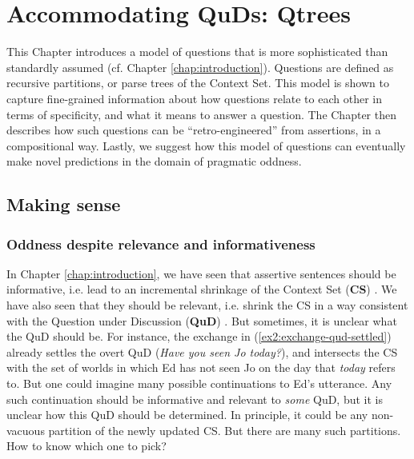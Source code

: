 \chapter{Accommodating QuDs: Qtrees}\label{chap:accommodating-quds}

This Chapter introduces a model of questions that is more sophisticated than standardly assumed (cf. Chapter \ref{chap:introduction}). Questions are defined as recursive partitions, or parse trees of the Context Set. This model is shown to capture fine-grained information about how questions relate to each other in terms of specificity, and what it means to answer a question. The Chapter then describes how such questions can be ``retro-engineered'' from assertions, in a compositional way. Lastly, we suggest how this model of questions can eventually make novel predictions in the domain of pragmatic oddness. 


\section{Making sense}

\subsection{Oddness despite relevance and informativeness}
In Chapter \ref{chap:introduction}, we have seen that assertive sentences should be informative, i.e. lead to an incremental shrinkage of the Context Set (\textbf{CS}) \citep{Stalnaker1978,Heim1982}. We have also seen that they should be relevant, i.e. shrink the CS in a way consistent with the Question under Discussion (\textbf{QuD}) \citep{Lewis1988,Roberts2012}. But sometimes, it is unclear what the QuD should be. For instance, the exchange in (\ref{ex2:exchange-qud-settled}) already settles the overt QuD (\textit{Have you seen Jo today?}), and intersects the CS with the set of worlds in which Ed has not seen Jo on the day that \textit{today} refers to. But one could imagine many possible continuations to Ed's utterance. Any such continuation should be informative and relevant to \textit{some} QuD, but it is unclear how this QuD should be determined. In principle, it could be any non-vacuous partition of the newly updated CS. But there are many such partitions. How to know which one to pick?

\begin{exe}
	\label{ex2:exchange-qud-settled}
\end{exe}

